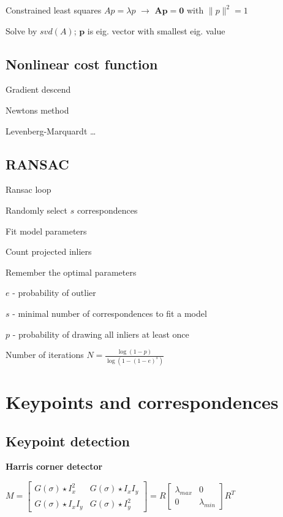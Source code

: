\documentclass{article}
\begin{document}
\begin{multicols*}{2}
{Constrained least squares $Ap = \lambda p$ $\to$ $\mathbf{Ap = 0}$ with $\|p\|^2=1$

Solve by $svd(A)$; $\mathbf{p}$ is eig. vector with smallest eig. value

\subsection{Nonlinear cost function}
\begin{compactitem}
	\item Gradient descend
	\item Newtons method
	\item Levenberg-Marquardt
	\dots
\end{compactitem}

\subsection{RANSAC}

Ransac loop
\begin{compactenum}
	\item Randomly select $s$ correspondences
	\item Fit model parameters
	\item Count projected inliers
	\item Remember the optimal parameters

\end{compactenum}
$e$ - probability of outlier

$s$ - minimal number of correspondences to fit a model

$p$ - probability of drawing all inliers at least once

Number of iterations $N = \frac{\log{(1-p)}}{\log{(1-(1-e)^s)}}$

\section{Keypoints and correspondences}

\subsection{Keypoint detection}

\textbf{Harris corner detector}

$ M = \left[\begin{array}{cc}
	G(\sigma) \star I_x^2 & G(\sigma) \star I_xI_y \\
	G(\sigma) \star I_xI_y & G(\sigma) \star I_y^2
\end{array}\right] = R \left[ \begin{array}{cc}
	\lambda_{max} & 0 \\
	0 & \lambda_{min}
\end{array} \right] R^T$

}
\end{multicols*}
\end{document}
